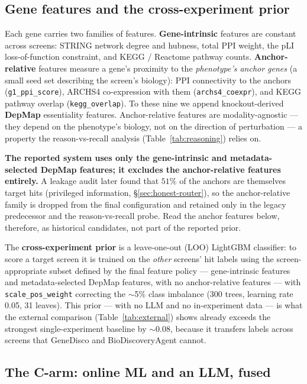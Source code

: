 \documentclass[11pt]{article}
\begin{document}
\subsection*{Gene features and the cross-experiment prior}

Each gene carries two families of features. \textbf{Gene-intrinsic} features are constant across screens:
STRING network degree and hubness, total PPI weight, the pLI loss-of-function constraint, and KEGG /
Reactome pathway counts. \textbf{Anchor-relative} features measure a gene's proximity to the
\emph{phenotype's anchor genes} (a small seed set describing the screen's biology): PPI connectivity to
the anchors (\texttt{g1\_ppi\_score}), ARCHS4 co-expression with them (\texttt{archs4\_coexpr}), and KEGG
pathway overlap (\texttt{kegg\_overlap}). To these nine we append knockout-derived \textbf{DepMap}
essentiality features. Anchor-relative features are modality-agnostic --- they depend on the phenotype's
biology, not on the direction of perturbation --- a property the reason-vs-recall analysis
(Table~\ref{tab:reasoning}) relies on.

\textbf{The reported system uses only the gene-intrinsic and metadata-selected DepMap features; it
excludes the anchor-relative features entirely.} A leakage audit later found that $51\%$ of the anchors
are themselves target hits (privileged information, \S\ref{sec:honest-router}), so the anchor-relative
family is dropped from the final configuration and retained only in the legacy predecessor and the
reason-vs-recall probe. Read the anchor features below, therefore, as historical candidates, not part of
the reported prior.

The \textbf{cross-experiment prior} is a leave-one-out (LOO) LightGBM classifier: to score a target
screen it is trained on the \emph{other} screens' hit labels using the screen-appropriate subset defined
by the final feature policy --- gene-intrinsic features and metadata-selected DepMap features, with no
anchor-relative features --- with \texttt{scale\_pos\_weight} correcting the $\sim$5\% class imbalance
(300 trees, learning rate 0.05, 31 leaves). This prior --- with no LLM and no in-experiment data --- is what the external comparison
(Table~\ref{tab:external}) shows already exceeds the strongest single-experiment baseline by $\sim$0.08,
because it transfers labels across screens that GeneDisco and BioDiscoveryAgent cannot.

\subsection*{The C-arm: online ML and an LLM, fused}
\end{document}

